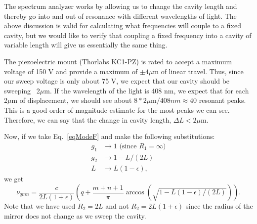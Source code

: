 The spectrum analyzer works by allowing us to change the cavity length and thereby go into and out of resonance with different wavelengths of light. The above discussion is valid for calculating what frequencies will couple to a fixed cavity, but we would like to verify that coupling a fixed frequency into a cavity of variable length will give us essentially the same thing.


The piezoelectric mount (Thorlabs KC1-PZ) is rated to accept a maximum voltage of 150 V and provide a maximum of $\pm4\mu$m of linear travel. Thus, since our sweep voltage is only about 75 V, we expect that our cavity should be sweeping ~2$\mu$m. If the wavelength of the light is 408 nm, we expect that for each 2$\mu$m of displacement, we should see about $8*2\mu$m$/408nm \approx 40$ resonant peaks. This is a good order of magnitude estimate for the most peaks we can see. Therefore, we can say that the change in cavity length, $\Delta L< 2\mu$m.

Now, if we take Eq.\ \ref{eqModeF} and make the following substitutions:
\begin{align}
g_1&\rightarrow1 \text{ (since $R_1=\infty$)} \\
g_2&\rightarrow 1-L/(2L)\\
L&\rightarrow L(1-\epsilon),
\end{align}
we get 
\begin{equation} \label{eqModeF_ready_for_expansion}
\nu_{qmn}=\frac{c}{2L(1+\epsilon)}\left(q+\frac{m+n+1}{\pi}\arccos(\sqrt{1-L(1-\epsilon)/(2L)})\right).
\end{equation}
Note that we have used $R_2=2L$ and not $R_2=2L(1+\epsilon)$ since the radius of the mirror does not change as we sweep the cavity. 

